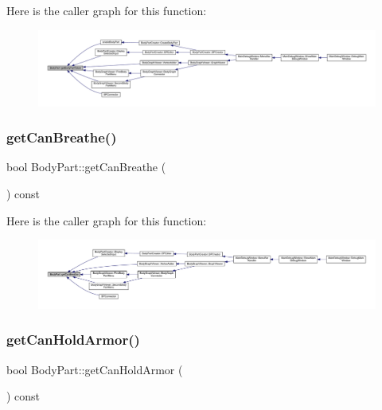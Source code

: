 Here is the caller graph for this function\+:
\nopagebreak
\begin{figure}[H]
\begin{center}
\leavevmode
\includegraphics[width=350pt]{d2/d6f/class_body_part_a9768feacb428c5611d0a8f58a0540618_icgraph}
\end{center}
\end{figure}
\mbox{\label{class_body_part_a9bbc06713cb6b2d0c6c978e5b307d85b}} 
\subsubsection{\texorpdfstring{get\+Can\+Breathe()}{getCanBreathe()}}
{\footnotesize\ttfamily bool Body\+Part\+::get\+Can\+Breathe (\begin{DoxyParamCaption}{ }\end{DoxyParamCaption}) const}

Here is the caller graph for this function\+:
\nopagebreak
\begin{figure}[H]
\begin{center}
\leavevmode
\includegraphics[width=350pt]{d2/d6f/class_body_part_a9bbc06713cb6b2d0c6c978e5b307d85b_icgraph}
\end{center}
\end{figure}
\mbox{\label{class_body_part_a0be339561a54fa3dbff4ebc27f4b3c4c}} 
\subsubsection{\texorpdfstring{get\+Can\+Hold\+Armor()}{getCanHoldArmor()}}
{\footnotesize\ttfamily bool Body\+Part\+::get\+Can\+Hold\+Armor (\begin{DoxyParamCaption}{ }\end{DoxyParamCaption}) const}

